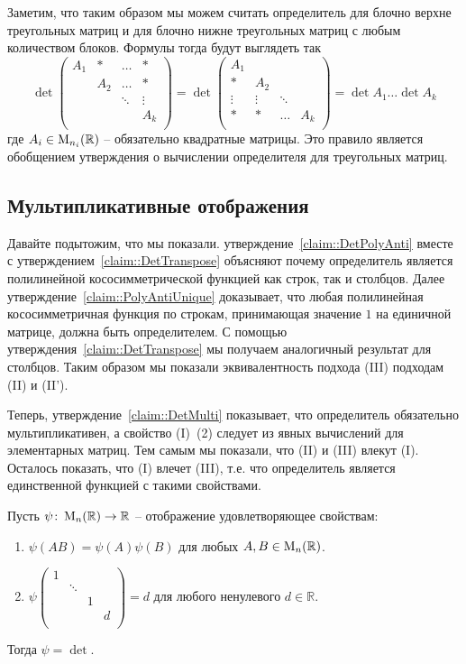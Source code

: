 Заметим, что таким образом мы можем считать определитель для блочно верхне треугольных матриц и для блочно нижне треугольных матриц с любым количеством блоков. Формулы тогда будут выглядеть так
\[
\det
\begin{pmatrix}
{A_1}&{*}&{\ldots}&{*}\\
{}&{A_2}&{\ldots}&{*}\\
{}&{}&{\ddots}&{\vdots}\\
{}&{}&{}&{A_k}\\
\end{pmatrix}
=
\det
\begin{pmatrix}
{A_1}&{}&{}&{}\\
{*}&{A_2}&{}&{}\\
{\vdots}&{\vdots}&{\ddots}&{}\\
{*}&{*}&{\ldots}&{A_k}\\
\end{pmatrix}
=\det A_1 \ldots \det A_k
\]
где $A_i\in\operatorname{M}_{n_i}(\mathbb R)$ -- обязательно квадратные матрицы. Это правило является обобщением утверждения о вычислении определителя для треугольных матриц.

\subsection{Мультипликативные отображения}

Давайте подытожим, что мы показали. утверждение~\ref{claim::DetPolyAnti} вместе с утверждением~\ref{claim::DetTranspose} объясняют почему определитель является полилинейной кососимметрической функцией как строк, так и столбцов. Далее утверждение~\ref{claim::PolyAntiUnique} доказывает, что любая полилинейная кососимметричная функция по строкам, принимающая значение $1$ на единичной матрице, должна быть определителем. С помощью утверждения~\ref{claim::DetTranspose} мы получаем аналогичный результат для столбцов. Таким образом мы показали эквивалентность подхода (III) подходам (II) и (II').

Теперь, утверждение~\ref{claim::DetMulti} показывает, что определитель обязательно мультипликативен, а свойство (I)~(2) следует из явных вычислений для элементарных матриц. Тем самым мы показали, что (II) и (III) влекут (I). Осталось показать, что (I) влечет (III), т.е. что определитель является единственной функцией с такими свойствами.

\begin{claim}\label{claim::DetMultiUnique}
Пусть $\psi\colon \operatorname{M}_{n}(\mathbb R)\to \mathbb R$ -- отображение удовлетворяющее свойствам:
\begin{enumerate}
\item $\psi(AB) = \psi(A)\psi(B)$ для любых $A,B\in\operatorname{M}_{n}(\mathbb R)$.

\item 
$
\psi
\begin{pmatrix}
{1}&{}&{}&{}\\
{}&{\ddots}&{}&{}\\
{}&{}&{1}&{}\\
{}&{}&{}&{d}\\
\end{pmatrix}
= 
d
$ для любого ненулевого $d\in\mathbb R$.
\end{enumerate}
Тогда $\psi = \det$.
\end{claim}

